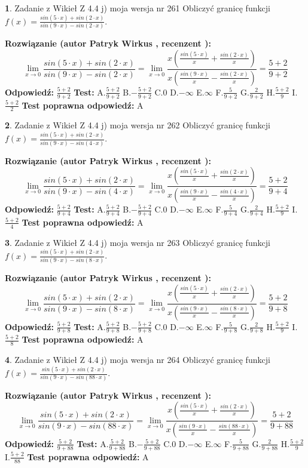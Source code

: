 \documentclass[12pt, a4paper]{article}
\theoremstyle{definition} %
\newtheorem{zad}{}
\newcommand{\zadStart}[1]{\begin{zad}#1\newline}
\newcommand{\zadStop}{\end{zad}}
\newcommand{\rozwStart}[2]{\noindent \textbf{Rozwiązanie (autor #1 , recenzent #2): }\newline}
\newcommand{\rozwStop}{\newline}
\newcommand{\odpStart}{\noindent \textbf{Odpowiedź:}\newline}
\newcommand{\odpStop}{\newline}
\newcommand{\testStart}{\noindent \textbf{Test:}\newline}
\newcommand{\testStop}{\newline}
\newcommand{\kluczStart}{\noindent \textbf{Test poprawna odpowiedź:}\newline}
\newcommand{\kluczStop}{\newline}
\begin{document}
\zadStart{Zadanie z Wikieł Z 4.4 j) moja wersja nr 261}
Obliczyć granicę funkcji $f(x)=\frac{sin(5\cdot x) +sin(2\cdot x)}{sin(9\cdot x) -sin(2\cdot x)}$.
\zadStop
\rozwStart{Patryk Wirkus}{}
$$\lim\limits_{x\to 0}\frac{sin(5\cdot x) +sin(2\cdot x)}{sin(9\cdot x) -sin(2\cdot x)}=\lim\limits_{x\to 0}\frac{x(\frac{sin(5\cdot x)}{x}+\frac{sin(2\cdot x)}{x})}{x(\frac{sin(9\cdot x)}{x}-\frac{sin(2\cdot x)}{x})}=\frac{5+2}{9+2}$$
\rozwStop
\odpStart
$\frac{5+2}{9+2}$
\odpStop
\testStart
A.$\frac{5+2}{9+2}$
B.$-\frac{5+2}{9+2}$
C.$0$
D.$-\infty$
E.$\infty$
F.$\frac{5}{9+2}$
G.$\frac{2}{9+2}$
H.$\frac{5+2}{9}$
I.$\frac{5+2}{2}$
\testStop
\kluczStart
A
\kluczStop



\zadStart{Zadanie z Wikieł Z 4.4 j) moja wersja nr 262}
Obliczyć granicę funkcji $f(x)=\frac{sin(5\cdot x) +sin(2\cdot x)}{sin(9\cdot x) -sin(4\cdot x)}$.
\zadStop
\rozwStart{Patryk Wirkus}{}
$$\lim\limits_{x\to 0}\frac{sin(5\cdot x) +sin(2\cdot x)}{sin(9\cdot x) -sin(4\cdot x)}=\lim\limits_{x\to 0}\frac{x(\frac{sin(5\cdot x)}{x}+\frac{sin(2\cdot x)}{x})}{x(\frac{sin(9\cdot x)}{x}-\frac{sin(4\cdot x)}{x})}=\frac{5+2}{9+4}$$
\rozwStop
\odpStart
$\frac{5+2}{9+4}$
\odpStop
\testStart
A.$\frac{5+2}{9+4}$
B.$-\frac{5+2}{9+4}$
C.$0$
D.$-\infty$
E.$\infty$
F.$\frac{5}{9+4}$
G.$\frac{2}{9+4}$
H.$\frac{5+2}{9}$
I.$\frac{5+2}{4}$
\testStop
\kluczStart
A
\kluczStop



\zadStart{Zadanie z Wikieł Z 4.4 j) moja wersja nr 263}
Obliczyć granicę funkcji $f(x)=\frac{sin(5\cdot x) +sin(2\cdot x)}{sin(9\cdot x) -sin(8\cdot x)}$.
\zadStop
\rozwStart{Patryk Wirkus}{}
$$\lim\limits_{x\to 0}\frac{sin(5\cdot x) +sin(2\cdot x)}{sin(9\cdot x) -sin(8\cdot x)}=\lim\limits_{x\to 0}\frac{x(\frac{sin(5\cdot x)}{x}+\frac{sin(2\cdot x)}{x})}{x(\frac{sin(9\cdot x)}{x}-\frac{sin(8\cdot x)}{x})}=\frac{5+2}{9+8}$$
\rozwStop
\odpStart
$\frac{5+2}{9+8}$
\odpStop
\testStart
A.$\frac{5+2}{9+8}$
B.$-\frac{5+2}{9+8}$
C.$0$
D.$-\infty$
E.$\infty$
F.$\frac{5}{9+8}$
G.$\frac{2}{9+8}$
H.$\frac{5+2}{9}$
I.$\frac{5+2}{8}$
\testStop
\kluczStart
A
\kluczStop



\zadStart{Zadanie z Wikieł Z 4.4 j) moja wersja nr 264}
Obliczyć granicę funkcji $f(x)=\frac{sin(5\cdot x) +sin(2\cdot x)}{sin(9\cdot x) -sin(88\cdot x)}$.
\zadStop
\rozwStart{Patryk Wirkus}{}
$$\lim\limits_{x\to 0}\frac{sin(5\cdot x) +sin(2\cdot x)}{sin(9\cdot x) -sin(88\cdot x)}=\lim\limits_{x\to 0}\frac{x(\frac{sin(5\cdot x)}{x}+\frac{sin(2\cdot x)}{x})}{x(\frac{sin(9\cdot x)}{x}-\frac{sin(88\cdot x)}{x})}=\frac{5+2}{9+88}$$
\rozwStop
\odpStart
$\frac{5+2}{9+88}$
\odpStop
\testStart
A.$\frac{5+2}{9+88}$
B.$-\frac{5+2}{9+88}$
C.$0$
D.$-\infty$
E.$\infty$
F.$\frac{5}{9+88}$
G.$\frac{2}{9+88}$
H.$\frac{5+2}{9}$
I.$\frac{5+2}{88}$
\testStop
\kluczStart
A
\kluczStop
\end{document}
